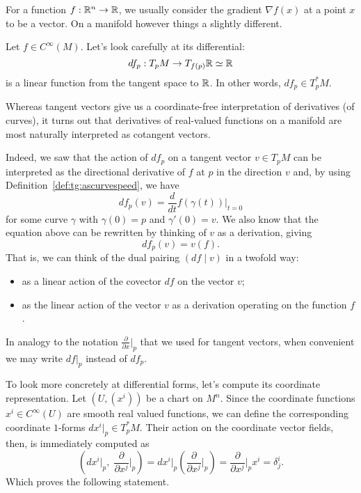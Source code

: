 For a function $f:\mathbb{R}^n\to\mathbb{R}$, we usually consider the gradient $\nabla f(x)$ at a point $x$ to be a vector.
On a manifold however things a slightly different.

\begin{example}
  Let $f\in C^\infty(M)$.
  Let's look carefully at its differential:
  \begin{equation}
    df_p: T_p M \to T_{f(p)}\mathbb{R} \simeq \mathbb{R}
  \end{equation}
  is a linear function from the tangent space to $\mathbb{R}$.
  In other words, $df_p \in T_p^* M$.
\end{example}

Whereas tangent vectors give us a coordinate-free interpretation of derivatives (of curves), it turns out that derivatives of real-valued functions on a manifold are most naturally interpreted as cotangent vectors.

Indeed, we saw that the action of $df_p$ on a tangent vector $v\in T_p M$ can be interpreted as the directional derivative of $f$ at $p$ in the direction $v$ and, by using Definition~\ref{def:tg:ascurvespeed}, we have
\begin{equation}
  df_p(v) = \frac{d}{dt}f(\gamma(t))\Big|_{t=0}
\end{equation}
for some curve $\gamma$ with $\gamma(0) = p$ and $\gamma'(0)=v$.
We also know that the equation above can be rewritten by thinking of $v$ as a derivation, giving
\begin{equation}
  df_p(v) = v(f).
\end{equation}
That is, we can think of the dual pairing $(df\mid v)$ in a twofold way:
\begin{itemize}
  \item as a linear action of the covector $df$ on the vector $v$;
  \item as the linear action of the vector $v$ as a derivation operating on the function $f$.
\end{itemize}

\begin{notation}
  In analogy to the notation $\frac{\partial}{\partial x}\big|_p$ that we used for tangent vectors, when convenient we may write $df|_p$ instead of $df_p$.
\end{notation}

To look more concretely at differential forms, let's compute its coordinate representation.
Let $(U,(x^i))$ be a chart on $M^n$.
Since the coordinate functions $x^i\in C^\infty(U)$ are smooth real valued functions, we can define the corresponding coordinate $1$-forms $dx^i|_p \in T_p^* M$.
Their action on the coordinate vector fields, then, is immediately computed as
\begin{equation}
  \left(dx^i|_p ,\; \frac{\partial}{\partial x^j}\Big|_p\right) =
  dx^i|_p \left(\frac{\partial}{\partial x^j}\Big|_p\right)
  = \frac{\partial}{\partial x^j}\Big|_p x^i
  = \delta^i_j.
\end{equation}
Which proves the following statement.

